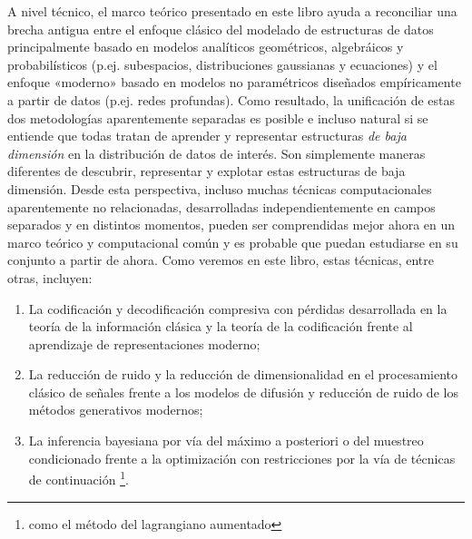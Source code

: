 \documentclass[../../book-main.tex]{subfiles}
\begin{document}
A nivel técnico, el marco teórico presentado en este libro ayuda a 
reconciliar una brecha antigua entre el enfoque clásico del
modelado de estructuras de datos principalmente basado en
modelos analíticos geométricos, algebráicos y probabilísticos 
(p.ej. subespacios, distribuciones gaussianas y ecuaciones) y el enfoque «moderno»
basado en modelos no paramétricos diseñados empíricamente a partir de datos
(p.ej. redes profundas). Como resultado, la unificación de
estas dos metodologías aparentemente separadas es posible e
incluso natural si se entiende que todas tratan de aprender y
representar estructuras {\em de baja dimensión} en la
distribución de datos de interés. Son simplemente maneras
diferentes de descubrir, representar y explotar estas estructuras 
de baja dimensión. Desde esta perspectiva, incluso muchas
técnicas computacionales aparentemente no relacionadas,
desarrolladas independientemente en campos separados y en distintos
momentos, pueden ser comprendidas mejor ahora en un marco teórico
y computacional común y es probable que puedan estudiarse en su
conjunto a partir de ahora. Como veremos en este libro, estas 
técnicas, entre otras, incluyen: 
\begin{enumerate}
    \item La codificación y decodificación compresiva con pérdidas
        desarrollada en la teoría de la información clásica y la
        teoría de la codificación frente al aprendizaje de 
        representaciones moderno;
    \item La reducción de ruido y la reducción de dimensionalidad
        en el procesamiento clásico de señales frente a los modelos
        de difusión y reducción de ruido de los métodos generativos
        modernos;
    \item La inferencia bayesiana por vía del máximo a posteriori o
        del muestreo condicionado frente a la optimización con 
        restricciones por la vía de técnicas de continuación
        \footnote{como el método del lagrangiano aumentado}.
\end{enumerate}
\end{document}
